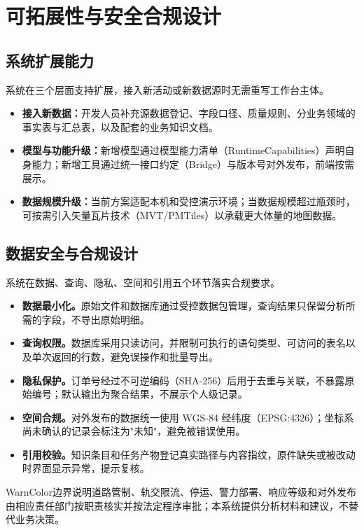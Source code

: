 \documentclass[a4paper,11pt]{article}
\newcommand{\bordersbox}[1]{\begin{admonition}{WarnColor}{边界说明}#1\end{admonition}}
\newcommand{\term}[1]{\textbf{#1}}
\begin{document}
\section{可拓展性与安全合规设计}

\subsection{系统扩展能力}

系统在三个层面支持扩展，接入新活动或新数据源时无需重写工作台主体。

\begin{itemize}
  \item \term{接入新数据：}开发人员补充源数据登记、字段口径、质量规则、分业务领域的事实表与汇总表，以及配套的业务知识文档。
  \item \term{模型与功能升级：}新增模型通过模型能力清单（RuntimeCapabilities）声明自身能力；新增工具通过统一接口约定（Bridge）与版本号对外发布，前端按需展示。
  \item \term{数据规模升级：}当前方案适配本机和受控演示环境；当数据规模超过瓶颈时，可按需引入矢量瓦片技术（MVT/PMTiles）以承载更大体量的地图数据。
\end{itemize}

\subsection{数据安全与合规设计}

系统在数据、查询、隐私、空间和引用五个环节落实合规要求。

\begin{itemize}
  \item \term{数据最小化。}原始文件和数据库通过受控数据包管理，查询结果只保留分析所需的字段，不导出原始明细。
  \item \term{查询权限。}数据库采用只读访问，并限制可执行的语句类型、可访问的表名以及单次返回的行数，避免误操作和批量导出。
  \item \term{隐私保护。}订单号经过不可逆编码（SHA-256）后用于去重与关联，不暴露原始编号；默认输出为聚合结果，不展示个人级记录。
  \item \term{空间合规。}对外发布的数据统一使用 WGS-84 经纬度（EPSG:4326）；坐标系尚未确认的记录会标注为"未知"，避免被错误使用。
  \item \term{引用校验。}知识条目和任务产物登记真实路径与内容指纹，原件缺失或被改动时界面显示异常，提示复核。
\end{itemize}

\bordersbox{道路管制、轨交限流、停运、警力部署、响应等级和对外发布由相应责任部门按职责核实并按法定程序审批；本系统提供分析材料和建议，不替代业务决策。}
\end{document}
